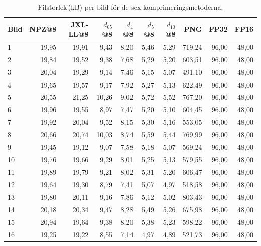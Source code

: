 \begin{table}[H]
\centering
\caption{Filstorlek\,(kB) per bild för de sex komprimeringsmetoderna.}
\label{tab:filstorlek_per_image}
{\footnotesize
\begin{tabular}{lrrrrrrrrr}
\hline
\textbf{Bild} & \textbf{NPZ@8} & \textbf{JXL-LL@8} & \boldmath$d_{05}$@8 & \boldmath$d_1$@8 & \boldmath$d_5$@8 & \boldmath$d_{10}$@8 & \textbf{PNG} & \textbf{FP32} & \textbf{FP16} \\
\hline
 1 & 19{,}95 & 19{,}91 & 9{,}43 & 8{,}20 & 5{,}46 & 5{,}29 & 719{,}24 & 96{,}00 & 48{,}00 \\
 2 & 19{,}84 & 19{,}52 & 9{,}38 & 7{,}68 & 5{,}29 & 5{,}20 & 603{,}51 & 96{,}00 & 48{,}00 \\
 3 & 20{,}04 & 19{,}29 & 9{,}14 & 7{,}46 & 5{,}15 & 5{,}07 & 491{,}10 & 96{,}00 & 48{,}00 \\
 4 & 19{,}65 & 19{,}57 & 9{,}17 & 7{,}92 & 5{,}27 & 5{,}13 & 622{,}49 & 96{,}00 & 48{,}00 \\
 5 & 20{,}55 & 21{,}25 & 10{,}26 & 9{,}02 & 5{,}72 & 5{,}52 & 767{,}20 & 96{,}00 & 48{,}00 \\
 6 & 19{,}96 & 19{,}55 & 8{,}97 & 7{,}47 & 5{,}20 & 5{,}10 & 604{,}45 & 96{,}00 & 48{,}00 \\
 7 & 19{,}92 & 20{,}04 & 9{,}52 & 8{,}15 & 5{,}30 & 5{,}16 & 553{,}05 & 96{,}00 & 48{,}00 \\
 8 & 20{,}66 & 20{,}74 & 10{,}03 & 8{,}74 & 5{,}59 & 5{,}44 & 769{,}99 & 96{,}00 & 48{,}00 \\
 9 & 19{,}45 & 19{,}12 & 9{,}07 & 7{,}58 & 5{,}18 & 5{,}07 & 569{,}24 & 96{,}00 & 48{,}00 \\
10 & 19{,}76 & 19{,}66 & 9{,}29 & 8{,}01 & 5{,}25 & 5{,}13 & 579{,}55 & 96{,}00 & 48{,}00 \\
11 & 19{,}89 & 19{,}79 & 9{,}21 & 8{,}02 & 5{,}31 & 5{,}20 & 606{,}47 & 96{,}00 & 48{,}00 \\
12 & 19{,}64 & 19{,}30 & 8{,}79 & 7{,}41 & 5{,}07 & 4{,}97 & 518{,}58 & 96{,}00 & 48{,}00 \\
13 & 19{,}80 & 20{,}11 & 9{,}16 & 7{,}86 & 5{,}12 & 5{,}02 & 803{,}43 & 96{,}00 & 48{,}00 \\
14 & 20{,}18 & 20{,}34 & 9{,}47 & 8{,}28 & 5{,}49 & 5{,}26 & 675{,}98 & 96{,}00 & 48{,}00 \\
15 & 20{,}94 & 19{,}64 & 9{,}38 & 8{,}20 & 5{,}38 & 5{,}23 & 598{,}22 & 96{,}00 & 48{,}00 \\
16 & 19{,}25 & 19{,}22 & 8{,}55 & 7{,}14 & 4{,}97 & 4{,}89 & 521{,}73 & 96{,}00 & 48{,}00 \\

\end{tabular}}
\end{table}
